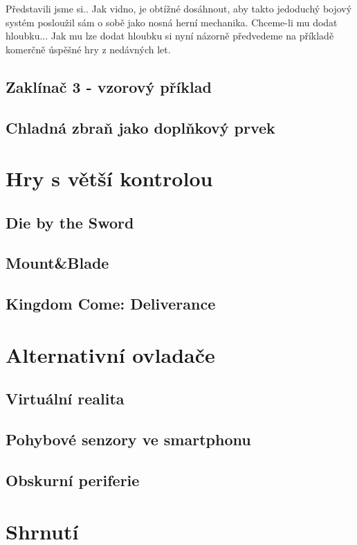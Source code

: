 Představili jsme si.. Jak vidno, je obtížné dosáhnout, aby takto jedoduchý bojový systém posloužil sám o sobě jako nosná herní mechanika. Chceme-li mu dodat hloubku... Jak mu lze dodat hloubku si nyní názorně předvedeme na příkladě komerčně úspěšné hry z nedávných let.

\subsection{Zaklínač 3 - vzorový příklad}

\subsection{Chladná zbraň jako doplňkový prvek}



\section{Hry s větší kontrolou}

\subsection{Die by the Sword}

\subsection{Mount\&Blade}

\subsection{Kingdom Come: Deliverance}




\section{Alternativní ovladače}

\subsection{Virtuální realita}

\subsection{Pohybové senzory ve smartphonu}

\subsection{Obskurní periferie}


\section{Shrnutí}
